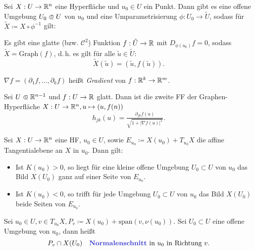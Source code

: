 \documentclass{cheat-sheet}
\newcommand{\Graph}{\mathrm{Graph}}
\newcommand{\Span}{\mathrm{span}} %
\begin{document}


\begin{satz}
  Sei $X : U \to \mathbb{R}^n$ eine Hyperfläche und $u_0 \in U$ ein Punkt. Dann gibt es eine offene Umgebung $U_0 \opn U$ von $u_0$ und eine Umparametrisierung $\phi : U_0 \to \tilde{U}$, sodass für $\tilde{X} \coloneqq X \circ \phi^{-1}$ gilt:

  Es gibt eine glatte (bzw. $\mathcal{C}^2$) Funktion $f : \tilde{U} \to \mathbb{R}$ mit $D_{\phi(u_0)} f = 0$, sodass $\tilde{X} = \Graph(f)$, d.\,h. es gilt für alle $\tilde{u} \in \tilde{U}$:
  \[ \tilde{X}(\tilde{u}) = (\tilde{u}, f(\tilde{u})). \]
\end{satz}

\begin{nota}
  $\nabla f = (\partial_1 f, ..., \partial_k f)$ heißt \emph{Gradient} von $f : \mathbb{R}^k \to \mathbb{R}^m$.
\end{nota}

\begin{satz}
  Sei $U \opn \R^{n-1}$ und $f : U \to \mathbb{R}$ glatt. Dann ist die zweite FF der Graphen-Hyperfläche $X : U \to \mathbb{R}^n, u \mapsto (u, f(n))$
  \[ h_{jk}(u) = \tfrac{\partial_{jk} f(u)}{\sqrt{1 + |\nabla f(u)|^2}}. \]
\end{satz}

\begin{satz}
  Sei $X : U \to \mathbb{R}^n$ eine HF, $u_0 \in U$, sowie $E_{u_0} \coloneqq X(u_0) + T_{u_0} X$ die affine Tangentialebene an $X$ in $u_0$. Dann gilt:
  \begin{itemize}
    \item Ist $K(u_0) > 0$, so liegt für eine kleine offene Umgebung $U_0 \subset U$ von $u_0$ das Bild $X(U_0)$ ganz auf einer Seite von $E_{u_0}$.
    \item Ist $K(u_0) < 0$, so trifft für jede Umgebung $U_0 \subset U$ von $u_0$ das Bild $X(U_0)$ beide Seiten von $E_{u_0}$.
  \end{itemize}
\end{satz}




\begin{defn}
  Sei $u_0 \in U, v \in T_{u_0} X, P_v \coloneqq X(u_0) + \Span(v, \nu(u_0))$.
  Sei $U_0 \subset U$ eine offene Umgebung von $u_0$, dann heißt
  \[
    P_v \cap X(U_0)
    \quad \text{\emph{Normalenschnitt} in $u_0$ in Richtung $v$.}
  \]
\end{defn}
\end{document}
